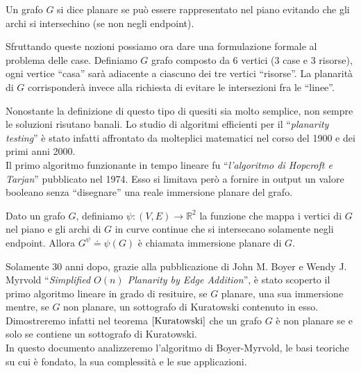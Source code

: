 \begin{definizione}\label{grafo-planare}
    Un grafo \(G\) si dice planare se può essere rappresentato nel piano evitando che gli archi si intersechino (se non negli endpoint).
\end{definizione}
Sfruttando queste nozioni possiamo ora dare una formulazione formale al problema delle case. Definiamo \(G\) grafo composto da 6 vertici (3 case e 3 risorse), ogni vertice “casa” sarà adiacente a ciascuno dei tre vertici “risorse”. La planarità di \(G\) corrisponderà invece alla richiesta di evitare le intersezioni fra le “linee”.

Nonostante la definizione di questo tipo di quesiti sia molto semplice, non sempre le soluzioni risutano banali. Lo studio di algoritmi efficienti per il “\textit{planarity testing}”  è stato infatti affrontato da molteplici matematici nel corso del 1900 e dei primi anni 2000.\\
Il primo algoritmo funzionante in tempo lineare fu “\textit{l'algoritmo di Hopcroft e Tarjan}\cite{Hopcroft}” pubblicato nel 1974. Esso si limitava però a fornire in output un valore booleano senza “disegnare” una reale immersione planare del grafo.
\begin{definizione}
    Dato un grafo \(G\), definiamo \(\psi : (V,E) \to \mathbb{R}^2\) la funzione che mappa i vertici di \(G\) nel piano e gli archi di \(G\) in curve continue che si intersecano solamente negli endpoint. Allora \(G^\psi \doteq \psi(G)\) è chiamata immersione planare di \(G\).
\end{definizione}
Solamente 30 anni dopo, grazie alla pubblicazione di John M. Boyer e Wendy J. Myrvold “\textit{Simplified \(O(n)\) Planarity by Edge Addition}\cite{main_article}”, è stato scoperto il primo algoritmo lineare in grado di resituire, se \(G\) planare, una sua immersione mentre, se \(G\) non planare, un sottografo di Kuratowski contenuto in esso. Dimostreremo infatti nel teorema \(\ref{Kuratowski}\) che un grafo \(G\) è non planare se e solo se contiene un sottografo di Kuratowski.
\\ In questo documento analizzeremo l'algoritmo di Boyer-Myrvold, le basi teoriche su cui è fondato, la sua complessità e le sue applicazioni.